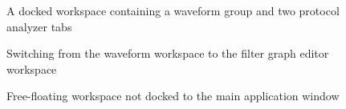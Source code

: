 \begin{figure}[h]
\centering
{}
\caption{A docked workspace containing a waveform group and two protocol analyzer tabs}
\label{w-workspace}
\end{figure}

\begin{figure}[h]
\centering
{}
\caption{Switching from the waveform workspace to the filter graph editor workspace}
\label{w-workspace2}
\end{figure}

\begin{figure}[h]
\centering
{}
\caption{Free-floating workspace not docked to the main application window}
\label{w-workspace3}
\end{figure}

